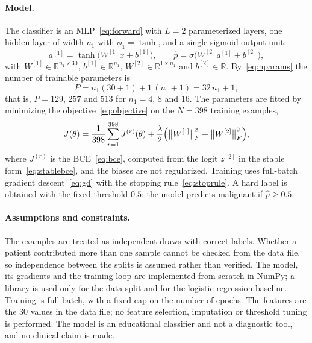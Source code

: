 \paragraph{Model.}
The classifier is an MLP~\eqref{eq:forward} with $L=2$ parameterized layers, one hidden layer of width $n_1$ with $\phi_1=\tanh$, and a single sigmoid output unit:
\begin{equation}
  a^{[1]}=\tanh\bigl(W^{[1]}x+b^{[1]}\bigr),\qquad
  \hat p=\sigma\bigl(W^{[2]}a^{[1]}+b^{[2]}\bigr),
  \label{eq:wdbc-model}
\end{equation}
with $W^{[1]}\in\mathbb{R}^{n_1\times 30}$, $b^{[1]}\in\mathbb{R}^{n_1}$, $W^{[2]}\in\mathbb{R}^{1\times n_1}$ and $b^{[2]}\in\mathbb{R}$. By~\eqref{eq:nparams} the number of trainable parameters is
\begin{equation}
  P=n_1(30+1)+1\,(n_1+1)=32\,n_1+1,
  \label{eq:wdbc-params}
\end{equation}
that is, $P=129$, $257$ and $513$ for $n_1=4$, $8$ and $16$. The parameters are fitted by minimizing the objective~\eqref{eq:objective} on the $N=398$ training examples,
\begin{equation}
  J(\theta)=\frac{1}{398}\sum_{r=1}^{398}J^{(r)}(\theta)+\frac{\lambda}{2}\Bigl(\bigl\lVert W^{[1]}\bigr\rVert_F^{2}+\bigl\lVert W^{[2]}\bigr\rVert_F^{2}\Bigr),
  \label{eq:wdbc-objective}
\end{equation}
where $J^{(r)}$ is the BCE~\eqref{eq:bce}, computed from the logit $z^{[2]}$ in the stable form~\eqref{eq:stablebce}, and the biases are not regularized. Training uses full-batch gradient descent~\eqref{eq:gd} with the stopping rule~\eqref{eq:stoprule}. A hard label is obtained with the fixed threshold $0.5$: the model predicts malignant if $\hat p\ge 0.5$.

\paragraph{Assumptions and constraints.}
The examples are treated as independent draws with correct labels. Whether a patient contributed more than one sample cannot be checked from the data file, so independence between the splits is assumed rather than verified. The model, its gradients and the training loop are implemented from scratch in NumPy; a library is used only for the data split and for the logistic-regression baseline. Training is full-batch, with a fixed cap on the number of epochs. The features are the 30 values in the data file; no feature selection, imputation or threshold tuning is performed. The model is an educational classifier and not a diagnostic tool, and no clinical claim is made.


